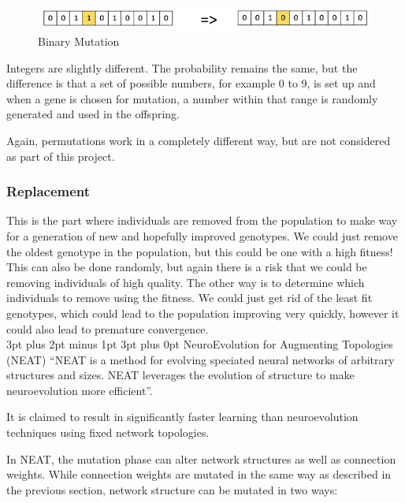 \documentclass[12pt,a4paper]{article}
\makeatletter
\renewcommand\subsection{\@startsection {subsection}{1}{2mm} %
                               {3pt plus 2pt minus 1pt} %
                               {3pt plus 0pt} %
                               {\normalfont\bfseries}}
\makeatother
\begin{document}
\begin{figure}[h]
	\centering
	\includegraphics[width = \textwidth]{BinaryMutation.png}
	\caption{Binary Mutation}
\end{figure}

\newpage
Integers are slightly different. The probability remains the same, but the difference is that a set of possible numbers, for example 0 to 9, is set up and when a gene is chosen for mutation, a number within that range is randomly generated and used in the offspring. 
 
Again, permutations work in a completely different way, but are not considered as part of this project. 

\subsubsection{Replacement}
This is the part where individuals are removed from the population to make way for a generation of new and hopefully improved genotypes. We could just remove the oldest genotype in the population, but this could be one with a high fitness! This can also be done randomly, but again there is a risk that we could be removing individuals of high quality. The other way is to determine which individuals to remove using the fitness. We could just get rid of the least fit genotypes, which could lead to the population improving very quickly, however it could also lead to premature convergence.\\

\newpage
\subsection{NeuroEvolution for Augmenting Topologies (NEAT)}
\enquote{NEAT is a method for evolving speciated neural networks of arbitrary structures and sizes. NEAT leverages the evolution of structure to make neuroevolution more efficient}\citep{NEAT}.

It is claimed to result in significantly faster learning than neuroevolution techniques using fixed network topologies.
 
 In NEAT, the mutation phase can alter network structures as well as connection weights\citep{EfficientEvolutionOfNeuralNetworkTopologies}. While connection weights are mutated in the same way as described in the previous section, network structure can be mutated in two ways:
 
\end{document}
